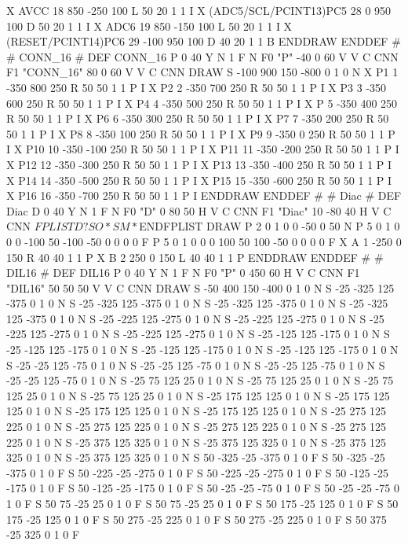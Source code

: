 X AVCC 18 850 -250 100 L 50 20 1 1 I
X (ADC5/SCL/PCINT13)PC5 28 0 950 100 D 50 20 1 1 I
X ADC6 19 850 -150 100 L 50 20 1 1 I
X (RESET/PCINT14)PC6 29 -100 950 100 D 40 20 1 1 B
ENDDRAW
ENDDEF
#
# CONN_16
#
DEF CONN_16 P 0 40 Y N 1 F N
F0 "P" -40 0 60 V V C CNN
F1 "CONN_16" 80 0 60 V V C CNN
DRAW
S -100 900 150 -800 0 1 0 N
X P1 1 -350 800 250 R 50 50 1 1 P I
X P2 2 -350 700 250 R 50 50 1 1 P I
X P3 3 -350 600 250 R 50 50 1 1 P I
X P4 4 -350 500 250 R 50 50 1 1 P I
X P 5 -350 400 250 R 50 50 1 1 P I
X P6 6 -350 300 250 R 50 50 1 1 P I
X P7 7 -350 200 250 R 50 50 1 1 P I
X P8 8 -350 100 250 R 50 50 1 1 P I
X P9 9 -350 0 250 R 50 50 1 1 P I
X P10 10 -350 -100 250 R 50 50 1 1 P I
X P11 11 -350 -200 250 R 50 50 1 1 P I
X P12 12 -350 -300 250 R 50 50 1 1 P I
X P13 13 -350 -400 250 R 50 50 1 1 P I
X P14 14 -350 -500 250 R 50 50 1 1 P I
X P15 15 -350 -600 250 R 50 50 1 1 P I
X P16 16 -350 -700 250 R 50 50 1 1 P I
ENDDRAW
ENDDEF
#
# Diac
#
DEF Diac D 0 40 Y N 1 F N
F0 "D" 0 80 50 H V C CNN
F1 "Diac" 10 -80 40 H V C CNN
$FPLIST
 D?
 SO*
 SM*
$ENDFPLIST
DRAW
P 2 0 1 0  0 -50  0 50 N
P 5 0 1 0  0 0  -100 50  -100 -50  0 0  0 0 F
P 5 0 1 0  0 0  100 50  100 -50  0 0  0 0 F
X A 1 -250 0 150 R 40 40 1 1 P
X B 2 250 0 150 L 40 40 1 1 P
ENDDRAW
ENDDEF
#
# DIL16
#
DEF DIL16 P 0 40 Y N 1 F N
F0 "P" 0 450 60 H V C CNN
F1 "DIL16" 50 50 50 V V C CNN
DRAW
S -50 400 150 -400 0 1 0 N
S -25 -325 125 -375 0 1 0 N
S -25 -325 125 -375 0 1 0 N
S -25 -325 125 -375 0 1 0 N
S -25 -325 125 -375 0 1 0 N
S -25 -225 125 -275 0 1 0 N
S -25 -225 125 -275 0 1 0 N
S -25 -225 125 -275 0 1 0 N
S -25 -225 125 -275 0 1 0 N
S -25 -125 125 -175 0 1 0 N
S -25 -125 125 -175 0 1 0 N
S -25 -125 125 -175 0 1 0 N
S -25 -125 125 -175 0 1 0 N
S -25 -25 125 -75 0 1 0 N
S -25 -25 125 -75 0 1 0 N
S -25 -25 125 -75 0 1 0 N
S -25 -25 125 -75 0 1 0 N
S -25 75 125 25 0 1 0 N
S -25 75 125 25 0 1 0 N
S -25 75 125 25 0 1 0 N
S -25 75 125 25 0 1 0 N
S -25 175 125 125 0 1 0 N
S -25 175 125 125 0 1 0 N
S -25 175 125 125 0 1 0 N
S -25 175 125 125 0 1 0 N
S -25 275 125 225 0 1 0 N
S -25 275 125 225 0 1 0 N
S -25 275 125 225 0 1 0 N
S -25 275 125 225 0 1 0 N
S -25 375 125 325 0 1 0 N
S -25 375 125 325 0 1 0 N
S -25 375 125 325 0 1 0 N
S -25 375 125 325 0 1 0 N
S 50 -325 -25 -375 0 1 0 F
S 50 -325 -25 -375 0 1 0 F
S 50 -225 -25 -275 0 1 0 F
S 50 -225 -25 -275 0 1 0 F
S 50 -125 -25 -175 0 1 0 F
S 50 -125 -25 -175 0 1 0 F
S 50 -25 -25 -75 0 1 0 F
S 50 -25 -25 -75 0 1 0 F
S 50 75 -25 25 0 1 0 F
S 50 75 -25 25 0 1 0 F
S 50 175 -25 125 0 1 0 F
S 50 175 -25 125 0 1 0 F
S 50 275 -25 225 0 1 0 F
S 50 275 -25 225 0 1 0 F
S 50 375 -25 325 0 1 0 F
